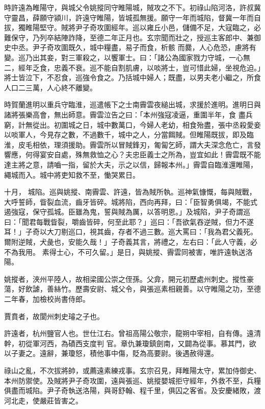 \begin{pinyinscope}
 時許遠為睢陽守，與城父令姚摐同守睢陽城，賊攻之不下。初祿山陷河洛，許叔冀守靈昌，薛願守潁川，許遠守睢陽，皆城孤無援。願守一年而城陷，督冀一年而自拔，獨睢陽堅守。賊將尹子奇攻圍經年。巡以雍丘小邑，儲備不足，大寇臨之，必難保守，乃列卒結陣詐降，至德二年正月也。玄宗聞而壯之，授巡主客郎中、兼御史中丞。尹子奇攻圍既久，城中糧盡，易子而食，析骸
 而爨，人心危恐，慮將有變。巡乃出其妾，對三軍殺之，以饗軍士。曰：「諸公為國家戮力守城，一心無二，經年乏食，忠義不衰。巡不能自割肌膚，以啖將士，豈可惜此婦，坐視危迫。」將士皆泣下，不忍食，巡強令食之。乃括城中婦人；既盡，以男夫老小繼之，所食人口二三萬，人心終不離變。



 時賀蘭進明以重兵守臨淮，巡遣帳下之士南霽雲夜縋出城，求援於進明。進明日與諸將張樂高會，無出師意。霽雲泣告之曰：「本州強寇凌逼，重圍半年，食
 盡兵窮，計無從出。初圍城之日，城中數萬口，今婦人老幼，相食殆盡，張中丞殺愛妾以啖軍人，今見存之數，不過數千，城中之人，分當餌賊。但睢陽既拔，即及臨淮，皮毛相依，理須援助。霽雲所以冒賊鋒刃，匍匐乞師，謂大夫深念危亡，言發響應，何得宴安自處，殊無救恤之心？夫忠臣義士之所為，豈宜如此！霽雲既不能達主將之意，請嚙一指，留於大夫，示之以信，歸報本州。」霽雲自臨淮還睢陽，繩城而入。城中將吏知救不至，慟哭累日。



 十月，
 城陷。巡與姚摐、南霽雲、許遠，皆為賊所執。巡神氣慷慨，每與賊戰，大呼誓師，眥裂血流，齒牙皆碎。城將陷，西向再拜，曰：「臣智勇俱竭，不能式遏強寇，保守孤城。臣雖為鬼，誓與賊為厲，以答明恩。」及城陷，尹子奇謂巡曰：「聞君每戰眥裂，嚼齒皆碎，何至此耶？」巡曰：「吾欲氣吞逆賊，但力不遂耳！」子奇以大刀剔巡口，視其齒，存者不過三數。巡大罵曰：「我為君父義死。爾附逆賊，犬彘也，安能久哉！」子奇義其言，將禮之，左右曰：「此人守義，必不為我用。
 素得士心，不可久留。」是日，與姚摐、霽雲同被害，唯許遠執送洛陽。



 姚摐者，浹州平陸人，故相梁國公崇之侄孫。父弇，開元初歷處州刺史。摐性豪蕩，好飲謔，善絲竹。歷壽安尉、城父令，與張巡素相親善。以守睢陽之功，至德二年春，加檢校尚書侍郎。



 賈賁者，故閬州刺史璿之子也。



 許遠者，杭州鹽官人也。世仕江右。曾祖高陽公敬宗，龍朔中宰相，自有傳。遠清幹，初從軍河西，為磧西支度判
 官。章仇兼瓊鎮劍南，又闢為從事。慕其門，欲以子妻之。遠辭，兼瓊怒，積他事中傷，貶為高要尉。後遇赦得還。



 祿山之亂，不次拔將帥，或薦遠素練戎事。玄宗召見，拜睢陽太守，累加侍御史、本州防禦使。及賊將尹子奇攻圍，遠與張巡、姚摐嬰城拒守經年，外救不至，兵糧俱盡而城陷。尹子奇執送洛陽，與哥舒翰、程千里，俱囚之客省。及安慶緒敗，渡河北走，使嚴莊皆害之。




\end{pinyinscope}
